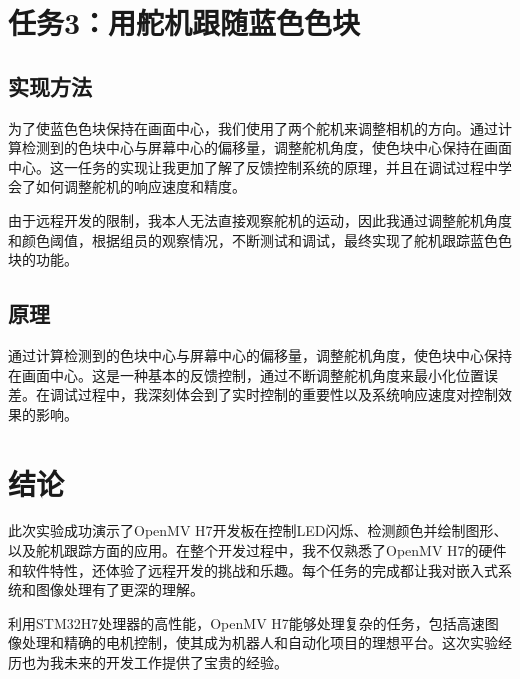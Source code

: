 \documentclass{article}
\begin{document}
\section{任务3：用舵机跟随蓝色色块}
\subsection{实现方法}
为了使蓝色色块保持在画面中心，我们使用了两个舵机来调整相机的方向。通过计算检测到的色块中心与屏幕中心的偏移量，调整舵机角度，使色块中心保持在画面中心。这一任务的实现让我更加了解了反馈控制系统的原理，并且在调试过程中学会了如何调整舵机的响应速度和精度。

由于远程开发的限制，我本人无法直接观察舵机的运动，因此我通过调整舵机角度和颜色阈值，根据组员的观察情况，不断测试和调试，最终实现了舵机跟踪蓝色色块的功能。

\subsection{原理}
通过计算检测到的色块中心与屏幕中心的偏移量，调整舵机角度，使色块中心保持在画面中心。这是一种基本的反馈控制，通过不断调整舵机角度来最小化位置误差。在调试过程中，我深刻体会到了实时控制的重要性以及系统响应速度对控制效果的影响。

\section{结论}
此次实验成功演示了OpenMV H7开发板在控制LED闪烁、检测颜色并绘制图形、以及舵机跟踪方面的应用。在整个开发过程中，我不仅熟悉了OpenMV H7的硬件和软件特性，还体验了远程开发的挑战和乐趣。每个任务的完成都让我对嵌入式系统和图像处理有了更深的理解。

利用STM32H7处理器的高性能，OpenMV H7能够处理复杂的任务，包括高速图像处理和精确的电机控制，使其成为机器人和自动化项目的理想平台。这次实验经历也为我未来的开发工作提供了宝贵的经验。
\end{document}
